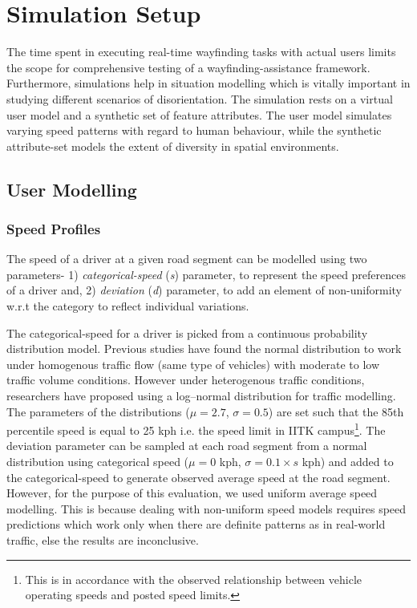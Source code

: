 \documentclass{iitkthesis}
\begin{document}
 \section{Simulation Setup} 
The time spent in executing real-time wayfinding tasks with actual
users limits the scope 
for comprehensive testing of a wayfinding-assistance framework. Furthermore,
simulations help in situation modelling which is vitally important in 
studying different scenarios of disorientation. The simulation rests on a 
virtual user model and a synthetic set of feature attributes. The user model 
simulates varying speed patterns with regard to human behaviour, while 
the synthetic attribute-set models the extent of diversity in spatial 
environments.
  \subsection{User Modelling}
  \subsubsection*{Speed Profiles}
The speed of a driver at a given road segment can be modelled using two 
parameters- 1) \textit{categorical-speed} (\textit{s}) parameter, to represent the 
speed preferences of a driver and, 2) \textit{deviation} (\textit{d}) parameter, to 
add an element of non-uniformity w.r.t the category to reflect individual
variations.

The categorical-speed for a driver is picked from a continuous 
probability distribution model. Previous studies \cite{leong,mclean}
have found the normal distribution to work under homogenous traffic flow 
(same type of vehicles) with moderate to low traffic volume conditions. 
However under heterogenous traffic conditions, researchers have proposed 
using a log–normal distribution \cite{gerl} for traffic modelling. 
The parameters of the distributions ($\mu= 2.7$, $\sigma=0.5$) are set such 
that the 85th percentile speed is equal to 25 kph i.e. the speed limit in 
IITK campus\footnote{This is in accordance with the observed relationship 
between vehicle operating speeds and posted speed limits.}. The 
deviation parameter can be sampled at each road segment from a normal 
distribution using categorical speed ($\mu=0$ kph, $\sigma=0.1\times s$ kph) and added to the 
categorical-speed to generate observed average speed at the road 
segment. However, for the purpose of this evaluation, we used uniform average speed modelling. This is because dealing with non-uniform speed models requires speed predictions which work only when there are definite patterns as in real-world traffic, else the results are inconclusive.
\end{document}
